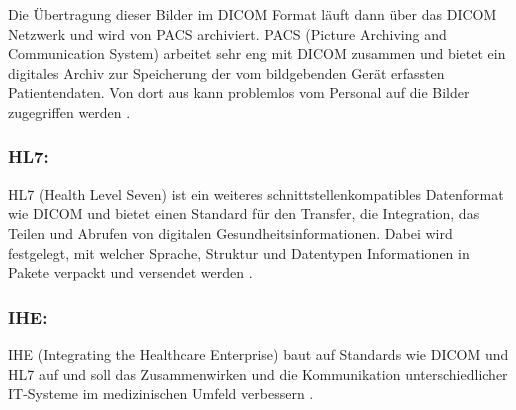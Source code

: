 %

Die Übertragung dieser Bilder im DICOM Format läuft dann über das DICOM Netzwerk und wird von PACS archiviert. PACS (Picture Archiving and Communication System) arbeitet sehr eng mit DICOM zusammen und bietet ein digitales Archiv zur Speicherung der vom bildgebenden Gerät erfassten Patientendaten. Von dort aus kann problemlos vom Personal auf die Bilder zugegriffen werden \cite{DICOM}.

\subsubsection{HL7:}
HL7 (Health Level Seven) ist ein weiteres schnittstellenkompatibles Datenformat wie DICOM \cite{DerDigitaleOperationssaal} und bietet einen Standard für den Transfer, die Integration, das Teilen und Abrufen von digitalen Gesundheitsinformationen. Dabei wird festgelegt, mit welcher Sprache, Struktur und Datentypen Informationen in Pakete verpackt und versendet werden \cite{HL7}.





\subsubsection{IHE:}
IHE (Integrating the Healthcare Enterprise) baut auf Standards wie DICOM und HL7 auf und soll das Zusammenwirken und die Kommunikation unterschiedlicher IT-Systeme im medizinischen Umfeld verbessern \cite{DICOMundIHE}.


